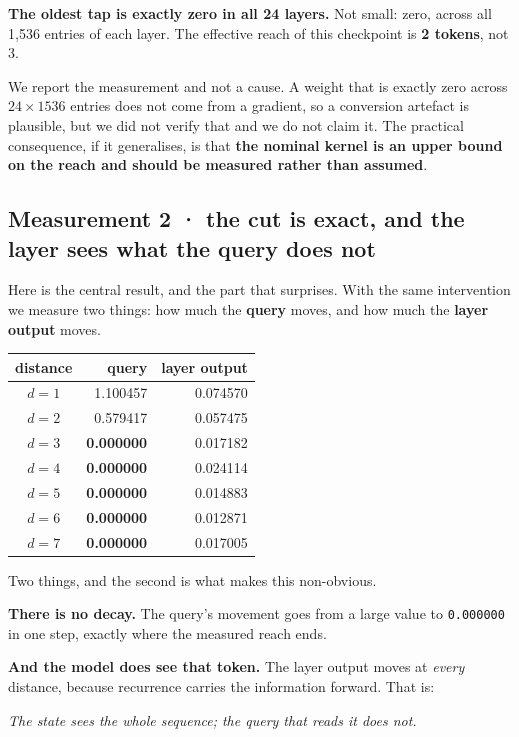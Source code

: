 \documentclass[11pt,a4paper]{article}
\begin{document}
\textbf{The oldest tap is exactly zero in all 24 layers.} Not small: zero, across all 1{,}536 entries
of each layer. The effective reach of this checkpoint is \textbf{2 tokens}, not 3.

We report the measurement and not a cause. A weight that is exactly zero across $24 \times 1536$
entries does not come from a gradient, so a conversion artefact is plausible, but we did not verify
that and we do not claim it. The practical consequence, if it generalises, is that \textbf{the nominal
kernel is an upper bound on the reach and should be measured rather than assumed}.

\subsection*{Measurement 2 · the cut is exact, and the layer sees what the query does not}

Here is the central result, and the part that surprises. With the same intervention we measure two
things: how much the \textbf{query} moves, and how much the \textbf{layer output} moves.

\begin{center}
\begin{tabular}{crr}
\toprule
distance & query & layer output \\
\midrule
$d=1$ & 1.100457 & 0.074570 \\
$d=2$ & 0.579417 & 0.057475 \\
$d=3$ & \textbf{0.000000} & 0.017182 \\
$d=4$ & \textbf{0.000000} & 0.024114 \\
$d=5$ & \textbf{0.000000} & 0.014883 \\
$d=6$ & \textbf{0.000000} & 0.012871 \\
$d=7$ & \textbf{0.000000} & 0.017005 \\
\bottomrule
\end{tabular}
\end{center}

Two things, and the second is what makes this non-obvious.

\textbf{There is no decay.} The query's movement goes from a large value to \texttt{0.000000} in one
step, exactly where the measured reach ends.

\textbf{And the model does see that token.} The layer output moves at \emph{every} distance, because
recurrence carries the information forward. That is:

\begin{center}
\emph{The state sees the whole sequence; the query that reads it does not.}
\end{center}
\end{document}
